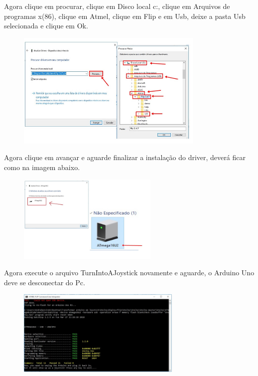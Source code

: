 \documentclass[
	12pt,			%
	openright,		%
	oneside,			%
	a4paper,			%
	chapter=TITLE,		%
	english,			%
	brazil,			%
	]{abntex2}
\begin{document}
\begin{anexosenv}
Agora clique em procurar, clique em Disco local c:, clique em Arquivos de programas x(86), clique em Atmel, clique em Flip e em Usb, deixe a pasta Usb selecionada e clique em Ok.

\begin{figure}[H]
	\centering
		\includegraphics[width=0.8\textwidth]{./img/anex-img-16.jpg}
\end{figure}

Agora clique em avançar e aguarde finalizar a instalação do driver, deverá ficar como na imagem abaixo.

\begin{figure}[H]
	\centering
		\includegraphics[width=0.6\textwidth]{./img/anex-img-17.jpg}
\end{figure}

Agora execute o arquivo TurnIntoAJoystick novamente e aguarde, o Arduino Uno deve se desconectar do Pc.

\begin{figure}[H]
	\centering
		\includegraphics[width=0.7\textwidth]{./img/anex-img-18.jpg}
\end{figure}


\end{anexosenv}
\end{document}
